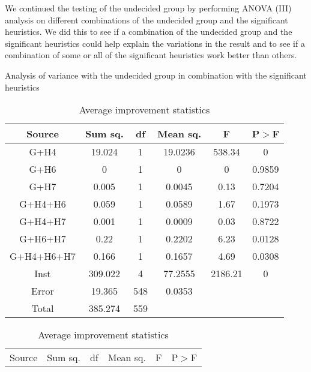 \documentclass[../main.tex]{subfiles}
\begin{document}
We continued the testing of the undecided group by performing ANOVA (III) analysis on different combinations of the undecided group and the significant heuristics. 
We did this to see if a combination of the undecided group and the significant heuristics could help explain the variations in the result and to see if a combination of some or all of the significant heuristics work better than others.

\begin{table}
    \centering
    \caption{Analysis of variance with the undecided group in combination with the significant heuristics}
    \begin{adjustbox}{width=\columnwidth,center}
        \begin{subtable}{.75\columnwidth}
            \centering
            \begin{tabular}{cccccc}
            \hline
            Source  &Sum sq.    &df &Mean sq.   &F      &P$>$F \\ 
            \hline
            G+H4        & 19.024    & 1 & 19.0236   & 538.34& 0     \\
            G+H6        & 0         & 1 & 0         & 0     & 0.9859\\
            G+H7        & 0.005     & 1 & 0.0045    & 0.13  & 0.7204\\
            G+H4+H6     & 0.059     & 1 & 0.0589    & 1.67  & 0.1973\\
            G+H4+H7     & 0.001     & 1 & 0.0009    & 0.03  & 0.8722\\
            G+H6+H7     & 0.22      & 1 & 0.2202    & 6.23  & 0.0128\\
            G+H4+H6+H7  & 0.166     & 1 & 0.1657    & 4.69  & 0.0308\\
            Inst        & 309.022   & 4 & 77.2555   &2186.21& 0     \\
            Error       & 19.365    &548& 0.0353    &       &       \\
            Total       & 385.274   &559&           &       &       \\
            \hline
            \end{tabular}
        \caption{Average improvement statistics}
        \label{tab:anovaAvrgGroup}
        \end{subtable}
        \hfill
        \begin{subtable}{.85\columnwidth}
            \centering
            \begin{tabular}{cccccc}
            \hline
            Source  &Sum sq.    &df &Mean sq.   &F      &P$>$F \\ 

\end{tabular}
\end{subtable}
\end{adjustbox}
\end{table}
\end{document}
